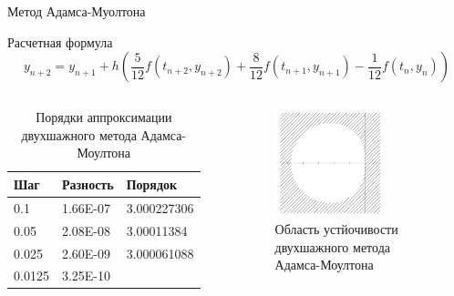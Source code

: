 \documentclass[ignoreonframetext,unicode]{beamer}
\begin{document}
\begin{frame}{Метод Адамса-Муолтона}
		
	\begin{block}{Расчетная формула}	
		\[
		y_{n+2} = y_{n+1} + h \left( \frac{5}{12} f(t_{n+2},y_{n+2}) + \frac{8}{12} f(t_{n+1},y_{n+1}) - \frac{1}{12} f(t_n,y_n) \right)
		\]
	\end{block}

	\begin{columns}
	\begin{table}[hbt!]
		\centering
		\begin{tabular}{|l|l|l|} 
			\hline
			Шаг      & Разность     & Порядок            \\ 
			\hline
			0.1    & 1.66E-07 & 3.000227306  \\ 
			\hline
			0.05   & 2.08E-08 & 3.00011384   \\ 
			\hline
			0.025  & 2.60E-09 & 3.000061088  \\ 
			\hline
			0.0125 & 3.25E-10 &              \\
			\hline
		\end{tabular}
		\vspace*{4mm}
		\label{table-Adams-2}
		\caption{Порядки аппроксимации двухшажного метода Адамса-Моултона}
	\end{table}

	\vspace{-4mm}
	\begin{figure}[hbt!]
		\centering
		\includegraphics[width=0.7\textwidth]{lin-stab-a-m-2}%
		\caption{Область устйочивости двухшажного метода Адамса-Моултона}
		\vspace*{-2mm}
		\label{lin-stab-a-m-2}
	\end{figure}
	\end{columns}
	
\end{frame}	
\end{document}
